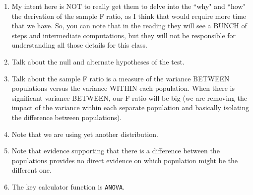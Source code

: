 \documentclass{article}
\begin{document}
\begin{enumerate}

    \item My intent here is NOT to really get them to delve into the ``why" and ``how" the derivation of the sample F ratio, as I think that would require more time that we have. So, you can note that in the reading they will see a BUNCH of steps and intermediate computations, but they will not be responsible for understanding all those details for this class.
    
    \item Talk about the null and alternate hypotheses of the test.
    
    \item Talk about the sample F ratio is a measure of the variance BETWEEN populations versus the variance WITHIN each population. When there is significant variance BETWEEN, our F ratio will be big (we are removing the impact of the variance within each separate population and basically isolating the difference between populations).
    
    \item Note that we are using yet another distribution.
    
    \item Note that evidence supporting that there is a difference between the populations provides no direct evidence on which population might be the different one.
    
    \item The key calculator function is \texttt{ANOVA}.
    
\end{enumerate}
\end{document}
